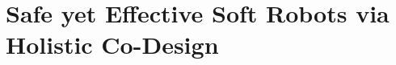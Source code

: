 \chapter{Safe yet Effective Soft Robots via Holistic Co-Design}
\label{chp:apx:holisticcodesign}

\begin{abstract}

\end{abstract}
